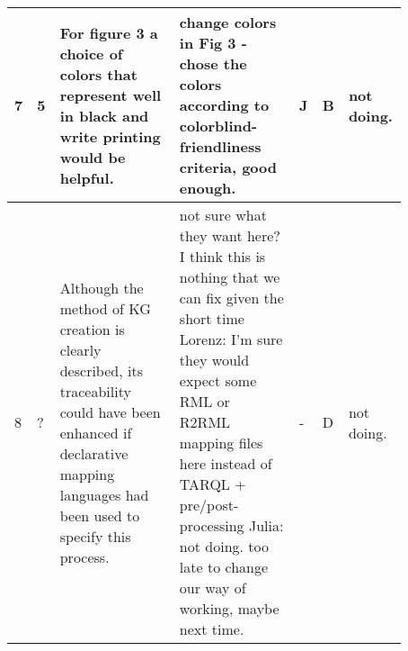 \documentclass[a4paper]{article}
\begin{document}
\begin{table}
\begin{tabularx}{\linewidth}{p{0.03\linewidth}| p{0.03\linewidth}| p{0.3\linewidth}| p{0.30\linewidth}| p{0.03\linewidth} |p{0.03\linewidth}|p{0.15\linewidth}}
\hline
7  &   5   &      For figure 3 a choice of colors that represent well in black and write printing would be helpful.   &    change colors in Fig 3  - chose the colors according to colorblind-friendliness criteria, good enough.     &  J    &   B                                    & not doing.  \\
\hline
8  &  ?    &   Although the method of KG creation is clearly described, its traceability could have been enhanced if declarative mapping languages had been used to specify this process.  
  &   not sure what they want here? I think this is nothing that we can fix given the short time   
  \newline Lorenz: I'm sure they would expect some RML or R2RML mapping files here instead of TARQL + pre/post-processing 
  Julia: not doing. too late to change our way of working, maybe next time.
  &  -     &                           D         & not doing. \\
\end{tabularx}
\end{table}
\end{document}
